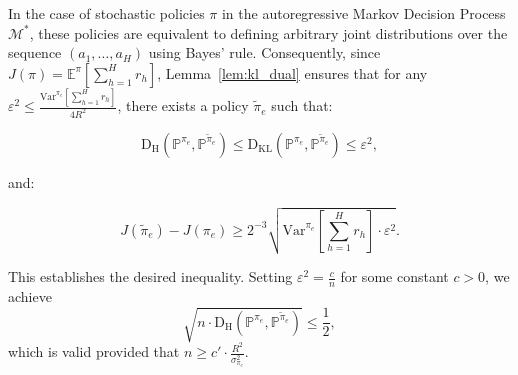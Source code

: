 In the case of stochastic policies \(\pi\) in the autoregressive Markov Decision Process \(\mathcal{M}^*\), these policies are equivalent to defining arbitrary joint distributions over the sequence \((a_1, \ldots, a_H)\) using Bayes' rule. Consequently, since \(J(\pi) = \mathbb{E}^\pi\left[\sum_{h=1}^H r_h\right]\), Lemma~\ref{lem:kl_dual} ensures that for any \(\varepsilon^2 \leq \frac{\mathrm{Var}^{\pi_e}\left[\sum_{h=1}^H r_h\right]}{4R^2}\), there exists a policy \(\tilde{\pi}_e\) such that:

\[
\mathrm{D}_{\text{H}}\left(\mathbb{P}^{\pi_e}, \mathbb{P}^{\tilde{\pi}_e}\right) \leq \mathrm{D}_{\text{KL}}\left(\mathbb{P}^{\pi_e}, \mathbb{P}^{\tilde{\pi}_e}\right) \leq \varepsilon^2,
\]

and:

\[
J(\tilde{\pi}_e) - J(\pi_e) \geq 2^{-3} \sqrt{\mathrm{Var}^{\pi_e}\left[\sum_{h=1}^H r_h\right] \cdot \varepsilon^2}.
\]

This establishes the desired inequality. Setting \(\varepsilon^2 = \frac{c}{n}\) for some constant \(c > 0\), we achieve 
$$\sqrt{n \cdot \mathrm{D}_{\text{H}}\left(\mathbb{P}^{\pi_e}, \mathbb{P}^{\tilde{\pi}_e}\right)} \leq \frac{1}{2},$$ 
which is valid provided that \(n \geq c' \cdot \frac{R^2}{\sigma_{\pi_e}^2}\).
